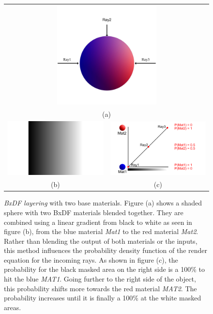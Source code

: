	\begin{figure}
		\centering\small 
		\begin{tabular}{@{}cc@{}}
			\multicolumn{2}{c}{\includegraphics[width=0.5\textwidth]{images/03cha_05_bxdfLayering_1.jpg}} \\
			\multicolumn{2}{c}{(a)} \\[6pt]	%
			\includegraphics[width=.475\textwidth]{images/03cha_05_BxDFLayeringMask.jpg} &
			\includegraphics[width=.475\textwidth]{images/03cha_05_BxDFLayeringPdf.jpg} \\[6pt]
			(b) & (c) 
		\end{tabular}
			\caption{ \emph{BxDF layering} with two base materials.
				Figure (a) shows a shaded sphere with two BxDF materials blended together. They are combined using a linear gradient  from black to white as seen in figure (b), from the blue material \emph{Mat1} to the red material \emph{Mat2}. Rather than blending the output of both materials or the inputs, this method influences the probability density function of the render equation for the incoming rays. As shown in figure (c), the probability for the black masked area on the right side is a 100\% to hit the blue \emph{MAT1}. Going further to the right side of the object, this probability shifts more towards the red material \emph{MAT2}. The probability increases until it is finally a 100\% at the white masked areas.}
		\label{fig:BxDFLayering}
	\end{figure}

